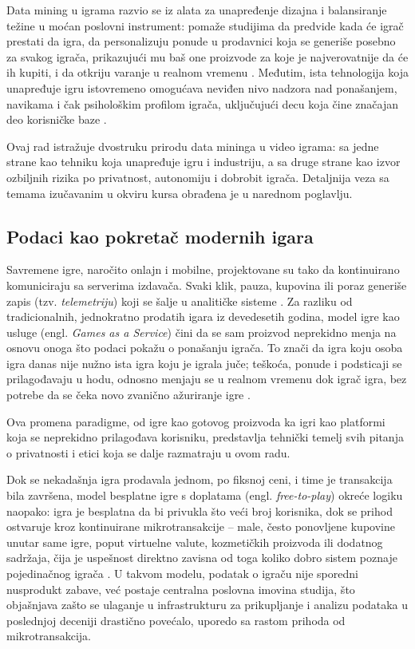 \documentclass[12pt]{article}
\begin{document}
Data mining u igrama razvio se iz alata za unapređenje dizajna i balansiranje težine u moćan poslovni instrument: pomaže studijima da predvide kada će igrač prestati da igra, da personalizuju ponude u prodavnici koja se generiše posebno za svakog igrača, prikazujući mu baš one proizvode za koje je najverovatnije da će ih kupiti, i da otkriju varanje u realnom vremenu \cite{drachen2013}. Međutim, ista tehnologija koja unapređuje igru istovremeno omogućava neviđen nivo nadzora nad ponašanjem, navikama i čak psihološkim profilom igrača, uključujući decu koja čine značajan deo korisničke baze \cite{kroger2023}.

Ovaj rad istražuje dvostruku prirodu data mininga u video igrama: sa jedne strane kao tehniku koja unapređuje igru i industriju, a sa druge strane kao izvor ozbiljnih rizika po privatnost, autonomiju i dobrobit igrača. Detaljnija veza sa temama izučavanim u okviru kursa obrađena je u narednom poglavlju.

\subsection{Podaci kao pokretač modernih igara}

Savremene igre, naročito onlajn i mobilne, projektovane su tako da kontinuirano komuniciraju sa serverima izdavača. Svaki klik, pauza, kupovina ili poraz generiše zapis (tzv. \textit{telemetriju}) koji se šalje u analitičke sisteme \cite{drachen2013}. Za razliku od tradicionalnih, jednokratno prodatih igara iz devedesetih godina, model igre kao usluge (engl. \textit{Games as a Service}) čini da se sam proizvod neprekidno menja na osnovu onoga što podaci pokažu o ponašanju igrača. To znači da igra koju osoba igra danas nije nužno ista igra koju je igrala juče; teškoća, ponude i podsticaji se prilagođavaju u hodu, odnosno menjaju se u realnom vremenu dok igrač igra, bez potrebe da se čeka novo zvanično ažuriranje igre \cite{bourdoucen2023}.

Ova promena paradigme, od igre kao gotovog proizvoda ka igri kao platformi koja se neprekidno prilagođava korisniku, predstavlja tehnički temelj svih pitanja o privatnosti i etici koja se dalje razmatraju u ovom radu.

Dok se nekadašnja igra prodavala jednom, po fiksnoj ceni, i time je transakcija bila završena, model besplatne igre s doplatama (engl. \textit{free-to-play}) okreće logiku naopako: igra je besplatna da bi privukla što veći broj korisnika, dok se prihod ostvaruje kroz kontinuirane mikrotransakcije -- male, često ponovljene kupovine unutar same igre, poput virtuelne valute, kozmetičkih proizvoda ili dodatnog sadržaja, čija je uspešnost direktno zavisna od toga koliko dobro sistem poznaje pojedinačnog igrača \cite{drachen2013}. U takvom modelu, podatak o igraču nije sporedni nusprodukt zabave, već postaje centralna poslovna imovina studija, što objašnjava zašto se ulaganje u infrastrukturu za prikupljanje i analizu podataka u poslednjoj deceniji drastično povećalo, uporedo sa rastom prihoda od mikrotransakcija.
\end{document}

